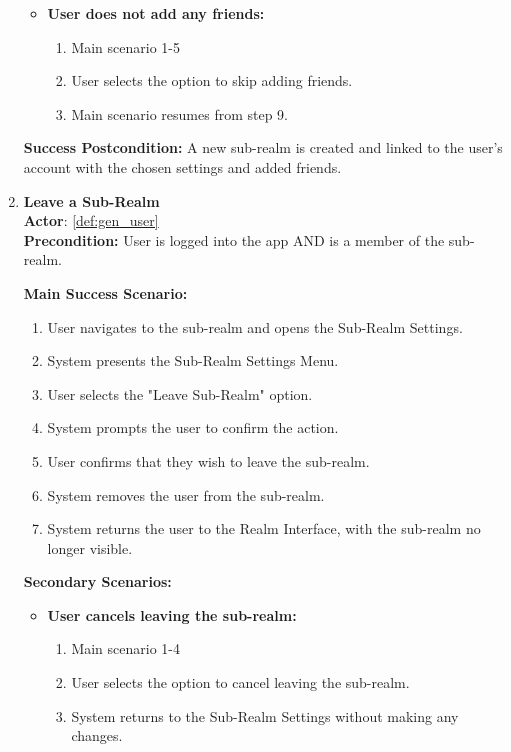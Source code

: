 \documentclass{article}
\begin{document}
\begin{enumerate}[label=\textbf{UC\arabic*}]
\begin{itemize}
            \item[{}] \textbf{User does not add any friends:}
            \begin{enumerate}[label=\textbf{\arabic*.}]
                \item Main scenario 1-5
                \item User selects the option to skip adding friends.
                \item Main scenario resumes from step 9.
            \end{enumerate}
        \end{itemize}
        
        \textbf{Success Postcondition:} A new sub-realm is created and linked to the user’s account with the chosen settings and added friends.

    \item \label{uc:18} \textbf{Leave a Sub-Realm} \\
        \textbf{Actor}: \ref{def:gen_user} \\
        \textbf{Precondition:} User is logged into the app AND is a member of the sub-realm.
    
        \textbf{Main Success Scenario:}
        \begin{enumerate}[label=\textbf{\arabic*.}]
            \item User navigates to the sub-realm and opens the Sub-Realm Settings.
            \item System presents the Sub-Realm Settings Menu.
            \item User selects the "Leave Sub-Realm" option.
            \item System prompts the user to confirm the action.
            \item User confirms that they wish to leave the sub-realm.
            \item System removes the user from the sub-realm.
            \item System returns the user to the Realm Interface, with the sub-realm no longer visible.
        \end{enumerate}
        
        \textbf{Secondary Scenarios:}
        \begin{itemize}
            \item[{}] \textbf{User cancels leaving the sub-realm:}
            \begin{enumerate}[label=\textbf{\arabic*.}]
                \item Main scenario 1-4
                \item User selects the option to cancel leaving the sub-realm.
                \item System returns to the Sub-Realm Settings without making any changes.
            \end{enumerate}
        \end{itemize}
        

\end{enumerate}
\end{document}

